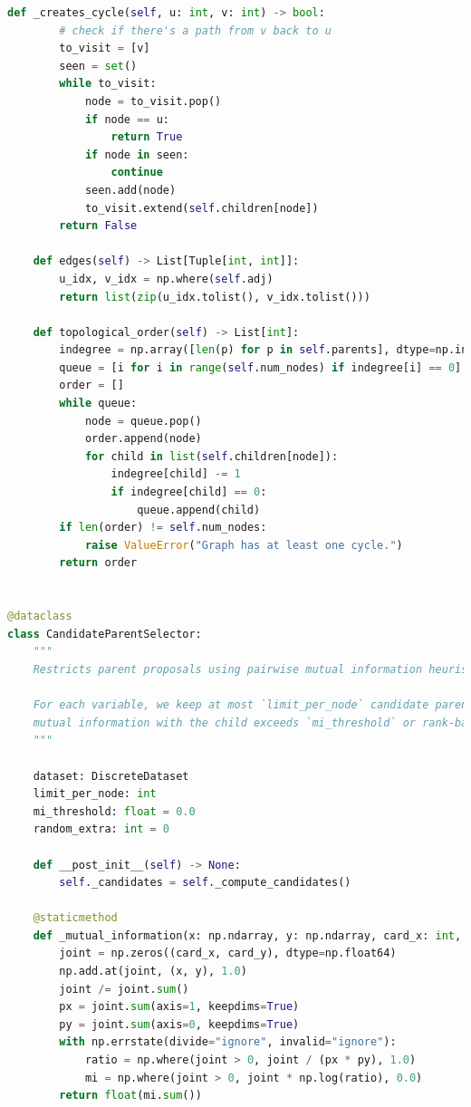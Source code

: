 \documentclass[twoside,11pt]{article}
\begin{document}
\begin{algorithm}
\begin{lstlisting}[language=Python]
    def _creates_cycle(self, u: int, v: int) -> bool:
        # check if there's a path from v back to u
        to_visit = [v]
        seen = set()
        while to_visit:
            node = to_visit.pop()
            if node == u:
                return True
            if node in seen:
                continue
            seen.add(node)
            to_visit.extend(self.children[node])
        return False

    def edges(self) -> List[Tuple[int, int]]:
        u_idx, v_idx = np.where(self.adj)
        return list(zip(u_idx.tolist(), v_idx.tolist()))

    def topological_order(self) -> List[int]:
        indegree = np.array([len(p) for p in self.parents], dtype=np.int32)
        queue = [i for i in range(self.num_nodes) if indegree[i] == 0]
        order = []
        while queue:
            node = queue.pop()
            order.append(node)
            for child in list(self.children[node]):
                indegree[child] -= 1
                if indegree[child] == 0:
                    queue.append(child)
        if len(order) != self.num_nodes:
            raise ValueError("Graph has at least one cycle.")
        return order


@dataclass
class CandidateParentSelector:
    """
    Restricts parent proposals using pairwise mutual information heuristics.

    For each variable, we keep at most `limit_per_node` candidate parents whose
    mutual information with the child exceeds `mi_threshold` or rank-based cutoff.
    """

    dataset: DiscreteDataset
    limit_per_node: int
    mi_threshold: float = 0.0
    random_extra: int = 0

    def __post_init__(self) -> None:
        self._candidates = self._compute_candidates()

    @staticmethod
    def _mutual_information(x: np.ndarray, y: np.ndarray, card_x: int, card_y: int) -> float:
        joint = np.zeros((card_x, card_y), dtype=np.float64)
        np.add.at(joint, (x, y), 1.0)
        joint /= joint.sum()
        px = joint.sum(axis=1, keepdims=True)
        py = joint.sum(axis=0, keepdims=True)
        with np.errstate(divide="ignore", invalid="ignore"):
            ratio = np.where(joint > 0, joint / (px * py), 1.0)
            mi = np.where(joint > 0, joint * np.log(ratio), 0.0)
        return float(mi.sum())


\end{lstlisting}
\end{algorithm}
\end{document}
